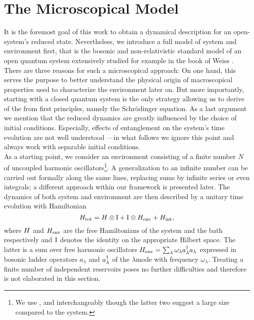 \section{The Microscopical Model}
\label{sec:nmqsd.model}
%
%

It is the foremost goal of this work to obtain a dynamical description for an open-system's reduced state.
Nevertheless, we introduce a full model of system and environment first, that is the bosonic and non-relativistic standard model of an open quantum system extensively studied for example in the book of Weiss \cite{We99_dissipative_systems}.
There are three reasons for such a microscopical approach:
On one hand, this serves the purpose to better understand the physical origin of macroscopical properties used to characterize the environment later on.
But more importantly, starting with a closed quantum system is the only strategy allowing us to derive of the \NMSSE from first principles, namely the Schrödinger equation.
As a last argument we mention that the reduced dynamics are greatly influenced by the choice of initial conditions.
Especially, effects of entanglement on the system's time evolution are not well understood \cite{}---in what follows we ignore this point and always work with separable initial conditions.\\



As a starting point, we consider an environment consisting of a finite number $N$ of uncoupled harmonic oscillators\footnote{%
  We use ,  and  interchangeably though the latter two suggest a large size compared to the system.
}.
A generalization to an infinite number can be carried out formally along the same lines, replacing sums by infinite series or even integrals; a different approach within our framework is presented later.
The dynamics of both system and environment are then described by a unitary time evolution with Hamiltonian
\begin{equation}
  H_\mathrm{tot} = H \otimes \mathrm{I}  +  \mathrm{I} \otimes H_\mathrm{env}  +  H_\mathrm{int},
  \label{eq:nmqsd.Htot}
\end{equation}
where $H$ and $H_\mathrm{env}$ are the free Hamiltonians of the system and the bath respectively and $\mathrm{I}$ denotes the identity on the appropriate Hilbert space.
The latter is a sum over free harmonic oscillators $H_\mathrm{env} = \sum_\lambda \omega_\lambda a^\dagger_\lambda a_\lambda$ expressed in bosonic ladder operators $a_\lambda$ and $a^\dagger_\lambda$ of the $\lambda$\th mode with frequency $\omega_\lambda$.
Treating a finite number of independent reservoirs poses no further difficulties and therefore is not elaborated in this section.

